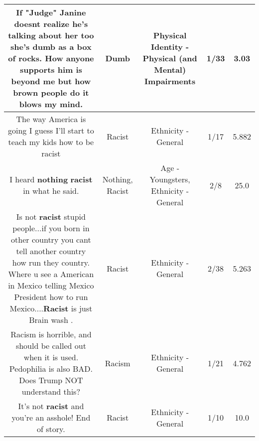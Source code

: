 \documentclass[11pt]{article}
\newlength\mylength
\begin{document}
\begin{center}
\begin{longtable}{|C{.65\mylength}|C{.30\mylength}|C{.12\mylength}|C{.12\mylength}|C{.12\mylength}|}
  \small If "Judge" Janine doesnt realize he's talking about her too she's \textbf{dumb} as a box of rocks. How anyone supports him is beyond me but how brown people do it blows my mind.\normalsize   & Dumb & Physical Identity - Physical (and Mental) Impairments & 1/33 & 3.03 \\  \hline
  \small The way America is going I guess I'll start to teach my kids how to be racist\normalsize   & Racist & Ethnicity - General & 1/17 & 5.882 \\  \hline
  \small I heard \textbf{nothing} \textbf{racist} in what he said.\normalsize   & Nothing, Racist & Age - Youngsters, Ethnicity - General & 2/8 & 25.0 \\  \hline
  \small Is not \textbf{racist} stupid people...if you born in other country you cant tell another country how run they country. Where u see a American in Mexico telling Mexico President how to run Mexico....\textbf{Racist} is just Brain wash .\normalsize   & Racist & Ethnicity - General & 2/38 & 5.263 \\  \hline
  \small Racism is horrible, and should be called out when it is used. Pedophilia is also BAD. Does Trump NOT understand this?\normalsize   & Racism & Ethnicity - General & 1/21 & 4.762 \\  \hline
  \small It's not \textbf{racist} and you're an asshole! End of story.\normalsize   & Racist & Ethnicity - General & 1/10 & 10.0 \\  \hline

\end{longtable}
\end{center}
\end{document}
